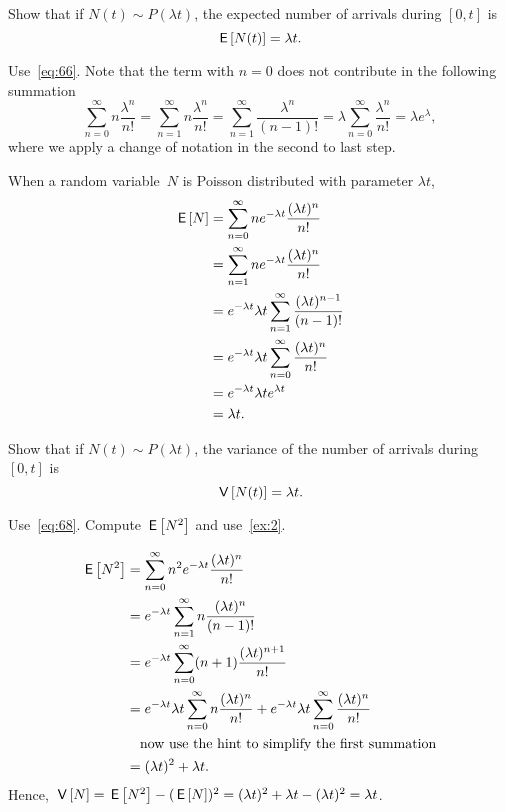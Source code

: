 \begin{exercise} 
 Show that if $N(t)\sim P(\lambda t)$, the expected number of arrivals during $[0,t]$ is
 \begin{equation*}
 \,\mathsf{E}\left[N(t)\right] = \lambda t.
 \end{equation*}
\begin{hint}
Use~\cref{eq:66}. Note that the term with $n=0$ does not contribute in the following summation
\begin{equation*}
\sum_{n=0}^\infty n \frac{\lambda^n}{n!} = \sum_{n=1}^\infty n \frac{\lambda^n}{n!} = \sum_{n=1}^\infty \frac{\lambda^n}{(n-1)!} = \lambda \sum_{n=0}^\infty \frac{\lambda^n}{n!} = \lambda e^{\lambda},
\end{equation*}
where we apply a change of notation in the second to last step.
\end{hint}
\begin{solution} 
 When a random variable~$N$ is Poisson distributed with parameter
 $\lambda t$,
 \begin{align*}
 \,\mathsf{E}\left[N\right] 
&= \sum_{n=0}^\infty n e^{-\lambda t}\frac{(\lambda t)^n}{n!} \\
&= \sum_{n=1}^\infty n e^{-\lambda t}\frac{(\lambda t)^n}{n!} \\ 
&= e^{-\lambda t} \lambda t \sum_{n=1}^\infty \frac{(\lambda t)^{n-1}}{(n-1)!} \\
&= e^{-\lambda t} \lambda t \sum_{n=0}^\infty \frac{(\lambda t)^{n}}{n!} \\
&= e^{-\lambda t} \lambda t e^{\lambda t} \\
&= \lambda t.
 \end{align*}
\end{solution}
\end{exercise}


\begin{extra}
 Show that if $N(t)\sim P(\lambda t)$, the variance of the number of arrivals during $[0,t]$ is
 \begin{equation*}
\,\mathsf{V}\left[N(t)\right] = \lambda t.
 \end{equation*}
\begin{hint} Use~\cref{eq:68}. Compute $\,\mathsf{E}\left[N^2\right]$ and use~\cref{ex:2}.
\end{hint}
\begin{solution} 

 \begin{align*}
 \,\mathsf{E}\left[N^2\right]
&= \sum_{n=0}^\infty n^2 e^{-\lambda t}\frac{(\lambda t)^n}{n!} \\
&= e^{-\lambda t} \sum_{n=1}^\infty n \frac{(\lambda t)^n}{(n-1)!} \\
&= e^{-\lambda t} \sum_{n=0}^\infty (n+1) \frac{(\lambda t)^{n+1}}{n!} \\
&= e^{-\lambda t} \lambda t \sum_{n=0}^\infty n \frac{(\lambda t)^{n}}{n!} +e^{-\lambda t}\lambda t \sum_{n=0}^\infty\frac{(\lambda t)^{n}}{n!} \\
&\quad\text{now use the hint to simplify the first summation} \\
&= (\lambda t)^2 + \lambda t.
\end{align*}
Hence, $\,\mathsf{V}\left[N\right] = \,\mathsf{E}\left[N^2\right] - (\,\mathsf{E}\left[N\right])^2 = (\lambda t)^2 + \lambda t - (\lambda t)^2 = \lambda t$.
\end{solution}
\end{extra}

